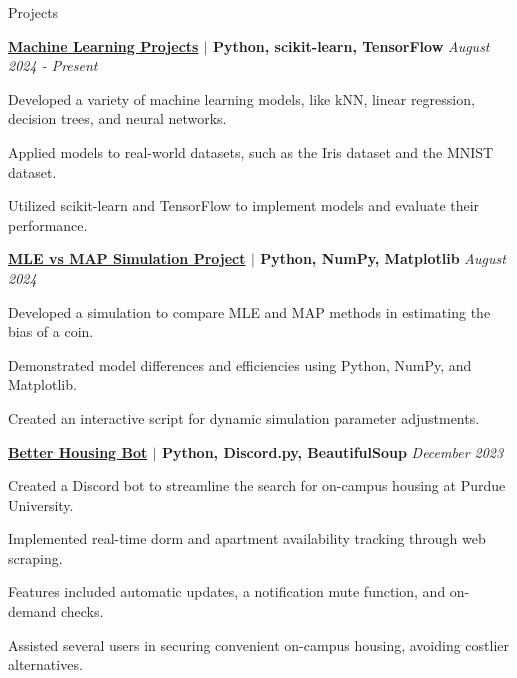 \documentclass[
    11pt, %
]{resume} %
\begin{document}
\vspace*{-0.4cm}
\begin{rSection}{Projects}


    \begin{rSubsection}{}{}{\bf \href{}{Machine Learning Projects} $\mid$ Python, scikit-learn, TensorFlow }{\hfill \em August 2024 - Present}
        \item Developed a variety of machine learning models, like kNN, linear regression, decision trees, and neural networks.
        \item Applied models to real-world datasets, such as the Iris dataset and the MNIST dataset.
        \item Utilized scikit-learn and TensorFlow to implement models and evaluate their performance.
    \end{rSubsection}


\begin{rSubsection}{}{}{\bf \href{https://github.com/maxinimus/MLEvsMAP}{MLE vs MAP Simulation Project} $\mid$ Python, NumPy, Matplotlib }{\hfill \em August 2024}
    \item Developed a simulation to compare MLE and MAP methods in estimating the bias of a coin.
    \item Demonstrated model differences and efficiencies using Python, NumPy, and Matplotlib.
    \item Created an interactive script for dynamic simulation parameter adjustments.
\end{rSubsection}



    \begin{rSubsection}{}{}{\bf \href{https://github.com/maxinimus/better-housing-bot}{Better Housing Bot} $\mid$ Python, Discord.py, BeautifulSoup }{\hfill \em December 2023}
        \item Created a Discord bot to streamline the search for on-campus housing at Purdue University.
        \item Implemented real-time dorm and apartment availability tracking through web scraping.
        \item Features included automatic updates, a notification mute function, and on-demand checks.
        \item Assisted several users in securing convenient on-campus housing, avoiding costlier alternatives.
    \end{rSubsection}


\end{rSection}
\end{document}
